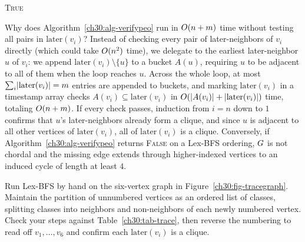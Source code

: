 \begin{algorithm}[H]
\caption{Verify whether an ordering $v_1,\dots,v_n$ is a PEO in linear time}
\label{ch30:alg-verifypeo}
\Return \textsc{True}\;
\end{algorithm}

Why does Algorithm~\ref{ch30:alg-verifypeo} run in $O(n+m)$ time without testing all pairs in $\mathrm{later}(v_i)$? Instead of checking every pair of later-neighbors of $v_i$ directly (which could take $O(n^2)$ time), we delegate to the earliest later-neighbor $u$ of $v_i$: we append $\mathrm{later}(v_i)\setminus\{u\}$ to a bucket $A(u)$, requiring $u$ to be adjacent to all of them when the loop reaches $u$. Across the whole loop, at most $\sum_i \lvert\mathrm{later}(v_i)\rvert = m$ entries are appended to buckets, and marking $\mathrm{later}(v_i)$ in a timestamp array checks $A(v_i)\subseteq \mathrm{later}(v_i)$ in $O(\lvert A(v_i)\rvert+\lvert\mathrm{later}(v_i)\rvert)$ time, totaling $O(n+m)$. If every check passes, induction from $i=n$ down to $1$ confirms that $u$'s later-neighbors already form a clique, and since $u$ is adjacent to all other vertices of $\mathrm{later}(v_i)$, all of $\mathrm{later}(v_i)$ is a clique. Conversely, if Algorithm~\ref{ch30:alg-verifypeo} returns \textsc{False} on a Lex-BFS ordering, $G$ is not chordal and the missing edge extends through higher-indexed vertices to an induced cycle of length at least $4$.

\begin{labbox}
Run Lex-BFS by hand on the six-vertex graph in Figure~\ref{ch30:fig-tracegraph}. Maintain the partition of unnumbered vertices as an ordered list of classes, splitting classes into neighbors and non-neighbors of each newly numbered vertex. Check your steps against Table~\ref{ch30:tab-trace}, then reverse the numbering to read off $v_1,\dots,v_6$ and confirm each $\mathrm{later}(v_i)$ is a clique.
\end{labbox}

